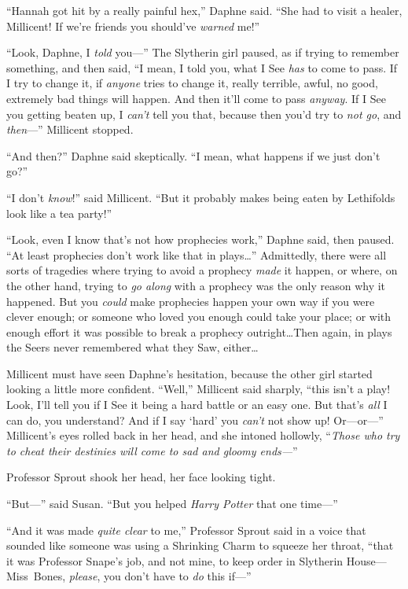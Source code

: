 “Hannah got hit by a really painful hex,” Daphne said. “She had to visit a healer, Millicent! If we’re friends you should’ve \emph{warned} me!”

“Look, Daphne, I \emph{told} you—” The Slytherin girl paused, as if trying to remember something, and then said, “I mean, I told you, what I See \emph{has} to come to pass. If I try to change it, if \emph{anyone} tries to change it, really terrible, awful, no good, extremely bad things will happen. And then it’ll come to pass \emph{anyway}. If I See you getting beaten up, I \emph{can’t} tell you that, because then you’d try to \emph{not go}, and \emph{then}—” Millicent stopped.

“And then?” Daphne said skeptically. “I mean, what happens if we just don’t go?”

“I don’t \emph{know}!” said Millicent. “But it probably makes being eaten by Lethifolds look like a tea party!”

“Look, even I know that’s not how prophecies work,” Daphne said, then paused. “At least prophecies don’t work like that in plays…” Admittedly, there were all sorts of tragedies where trying to avoid a prophecy \emph{made} it happen, or where, on the other hand, trying to \emph{go along} with a prophecy was the only reason why it happened. But you \emph{could} make prophecies happen your own way if you were clever enough; or someone who loved you enough could take your place; or with enough effort it was possible to break a prophecy outright…Then again, in plays the Seers never remembered what they Saw, either…

Millicent must have seen Daphne’s hesitation, because the other girl started looking a little more confident. “Well,” Millicent said sharply, “this isn’t a play! Look, I’ll tell you if I See it being a hard battle or an easy one. But that’s \emph{all} I can do, you understand? And if I say ‘hard’ you \emph{can’t} not show up! Or—or—” Millicent’s eyes rolled back in her head, and she intoned hollowly, “\emph{Those who try to cheat their destinies will come to sad and gloomy ends—}”

\later

Professor Sprout shook her head, her face looking tight.

“But—” said Susan. “But you helped \emph{Harry Potter} that one time—”

“And it was made \emph{quite clear} to me,” Professor Sprout said in a voice that sounded like someone was using a Shrinking Charm to squeeze her throat, “that it was Professor Snape’s job, and not mine, to keep order in Slytherin House—Miss~Bones, \emph{please}, you don’t have to \emph{do} this if—”

